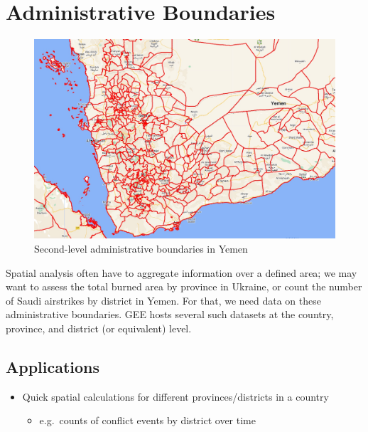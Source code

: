 \documentclass[
  letterpaper,
  DIV=11,
  numbers=noendperiod]{scrreprt}
\providecommand{\tightlist}{%
  \setlength{\itemsep}{0pt}\setlength{\parskip}{0pt}}\usepackage{longtable,booktabs,array}
\begin{document}
\hypertarget{administrative-boundaries}{%
\section{Administrative Boundaries}\label{administrative-boundaries}}

\begin{figure}

{\centering \includegraphics{././images/fao_gaul.jpg}

}

\caption{Second-level administrative boundaries in Yemen}

\end{figure}

Spatial analysis often have to aggregate information over a defined
area; we may want to assess the total burned area by province in
Ukraine, or count the number of Saudi airstrikes by district in Yemen.
For that, we need data on these administrative boundaries. GEE hosts
several such datasets at the country, province, and district (or
equivalent) level.

\hypertarget{applications-8}{%
\subsection*{Applications}\label{applications-8}}

\begin{itemize}
\tightlist
\item
  Quick spatial calculations for different provinces/districts in a
  country

  \begin{itemize}
  \tightlist
  \item
    e.g.~counts of conflict events by district over time
  \end{itemize}
\end{itemize}
\end{document}
